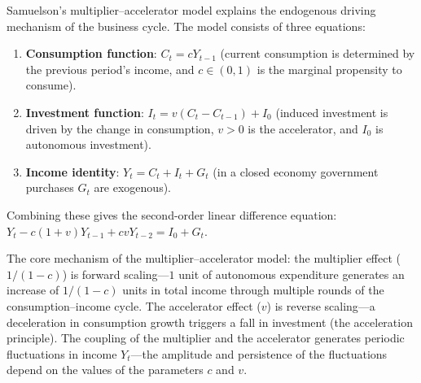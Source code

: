 \begin{definition}\label{def:multiplier_accelerator}
Samuelson's multiplier--accelerator model explains the endogenous driving mechanism of the business cycle. The model consists of three equations:
\begin{enumerate}[label=(\roman*)]
    \item \textbf{Consumption function}: $C_t = cY_{t-1}$ (current consumption is determined by the previous period's income, and $c \in (0,1)$ is the marginal propensity to consume).
    \item \textbf{Investment function}: $I_t = v(C_t - C_{t-1}) + I_0$ (induced investment is driven by the change in consumption, $v > 0$ is the accelerator, and $I_0$ is autonomous investment).
    \item \textbf{Income identity}: $Y_t = C_t + I_t + G_t$ (in a closed economy government purchases $G_t$ are exogenous).
\end{enumerate}
Combining these gives the second-order linear difference equation: $Y_t - c(1+v)Y_{t-1} + cvY_{t-2} = I_0 + G_t$.

The core mechanism of the multiplier--accelerator model: the multiplier effect ($1/(1-c)$) is forward scaling---$1$ unit of autonomous expenditure generates an increase of $1/(1-c)$ units in total income through multiple rounds of the consumption--income cycle. The accelerator effect ($v$) is reverse scaling---a deceleration in consumption growth triggers a fall in investment (the acceleration principle). The coupling of the multiplier and the accelerator generates periodic fluctuations in income $Y_t$---the amplitude and persistence of the fluctuations depend on the values of the parameters $c$ and $v$.
\end{definition}

